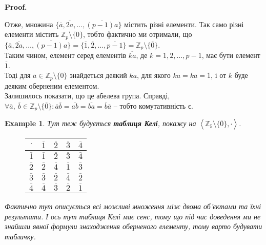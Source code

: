 \documentclass[a4paper, 10pt]{article}
\makeatletter
\theoremstyle{theoremdd}
\theoremstyle{theoremdd}
\theoremstyle{theoremdd}
\theoremstyle{theoremdd}
\theoremstyle{theoremdd}
\newtheorem{example}[theorem]{Example}
\theoremstyle{theoremdd}
\theoremstyle{theoremdd}
\theoremstyle{theoremdd}
\theoremstyle{theoremdd}
\theoremstyle{theoremdd}
\theoremstyle{theoremdd}
\theoremstyle{theoremdd}
\theoremstyle{theoremdd}
\theoremstyle{theoremdd}
\theoremstyle{theoremdd}
\renewenvironment{proof}[1][Proof.\\]{\par
\pushQED{\hfill \qed}%
\normalfont \topsep6\p@\@plus6\p@\relax
\trivlist
\item\relax
{\bfseries
#1\@addpunct{.}}\hspace\labelsep\ignorespaces
}{%
\popQED\endtrivlist\@endpefalse
}
\makeatother
\begin{document}
\begin{proof}
Отже, множина $\{\overline{a}, \overline{2a}, \dots, \overline{(p-1)a} \}$ містить різні елементи. Так само різні елементи містить $\mathbb{Z}_p \setminus \{ \overline{0}\}$, тобто фактично ми отримали, що\\
$\{\overline{a}, \overline{2a}, \dots, \overline{(p-1)a} \} = \{ \overline{1}, \overline{2}, \dots, \overline{p-1} \} = \mathbb{Z}_p \setminus \{ \overline{0}\}$.\\
Таким чином, елемент серед елементів $\overline{ka}$, де $k = 1,2,\dots,p-1$, має бути елемент $\overline{1}$. \\
Тоді для $\overline{a} \in \mathbb{Z}_p \setminus \{ \overline{0}\}$ знайдеться деякий $\overline{ka}$, для якого $\overline{ka} = \overline{k} \overline{a} = \overline{1}$, і от $\overline{k}$ буде деяким оберненим елементом.\\
Залишилось показати, що це абелева група. Справді,\\
$\forall \overline{a},\ \overline{b} \in \mathbb{Z}_p \setminus \{ \overline{0}\}: \overline{a} \overline{b} = \overline{ab} = \overline{ba} = \overline{b} \overline{a}$ -- тобто комутативність є.
\end{proof}

\begin{example}
Тут теж будується \textbf{таблиця Келі}, покажу на $\left<\mathbb{Z}_5 \setminus \{\overline{0}\},\cdot \right>$.
\begin{figure}[H]
\centering
\begin{tabular}{c|cccc}
$\cdot$ & $\overline{1}$ & $\overline{2}$ & $\overline{3}$ & $\overline{4}$ \\
\hline
$\overline{1}$ & $\overline{1}$ & $\overline{2}$ & $\overline{3}$ & $\overline{4}$ \\
$\overline{2}$ & $\overline{2}$ & $\overline{4}$ & $\overline{1}$ & $\overline{3}$ \\
$\overline{3}$ & $\overline{3}$ & $\overline{2}$ & $\overline{4}$ & $\overline{2}$ \\
$\overline{4}$ & $\overline{4}$ & $\overline{3}$ & $\overline{2}$ & $\overline{1}$ \\
\end{tabular}
\end{figure}
Фактично тут описується всі можливі множення між двома об'єктами та їхні результати. І ось тут таблиця Келі має сенс, тому що під час доведення ми не знайшли явної формули знаходження оберненого елементу, тому варто будувати табличку.
\end{example}
\end{document}
